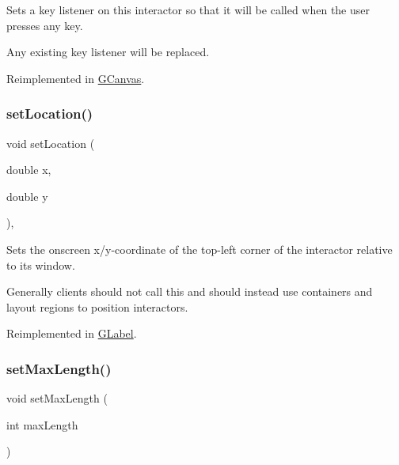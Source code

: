Sets a key listener on this interactor so that it will be called when the user presses any key. 

Any existing key listener will be replaced. 

Reimplemented in \mbox{\hyperlink{classGCanvas_a1320ed9889a730dfead04a334463ecf3}{G\+Canvas}}.

\mbox{\label{classGInteractor_a04594e8ba9b98513a64f1da00dcae18c}} 
\subsubsection{\texorpdfstring{set\+Location()}{setLocation()}}
{\footnotesize\ttfamily void set\+Location (\begin{DoxyParamCaption}\item[{double}]{x,  }\item[{double}]{y }\end{DoxyParamCaption})\hspace{0.3cm}{\ttfamily [virtual]}, {\ttfamily [inherited]}}



Sets the onscreen x/y-\/coordinate of the top-\/left corner of the interactor relative to its window. 

Generally clients should not call this and should instead use containers and layout regions to position interactors. 

Reimplemented in \mbox{\hyperlink{classGLabel_ae3b17c0aeb355dc23c4e4cbf066e81f7}{G\+Label}}.

\mbox{\label{classGTextField_a077c24fa5337fbf431738f8ba513d19c}} 
\subsubsection{\texorpdfstring{set\+Max\+Length()}{setMaxLength()}}
{\footnotesize\ttfamily void set\+Max\+Length (\begin{DoxyParamCaption}\item[{int}]{max\+Length }\end{DoxyParamCaption})\hspace{0.3cm}{\ttfamily [virtual]}}



